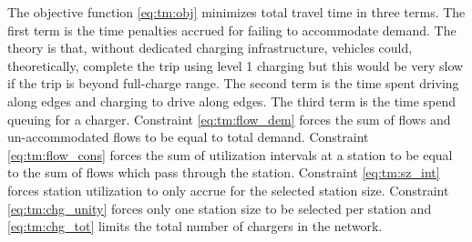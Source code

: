 \documentclass[12pt]{article}
\begin{document}
The objective function \eqref{eq:tm:obj} minimizes total travel time in three terms. The first term is the time penalties accrued for failing to accommodate demand. The theory is that, without dedicated charging infrastructure, vehicles could, theoretically, complete the trip using level 1 charging but this would be very slow if the trip is beyond full-charge range. The second term is the time spent driving along edges and charging to drive along edges. The third term is the time spend queuing for a charger. Constraint \eqref{eq:tm:flow_dem} forces the sum of flows and un-accommodated flows to be equal to total demand. Constraint \eqref{eq:tm:flow_cons} forces the sum of utilization intervals at a station to be equal to the sum of flows which pass through the station. Constraint \eqref{eq:tm:sz_int} forces station utilization to only accrue for the selected station size. Constraint \eqref{eq:tm:chg_unity} forces only one station size to be selected per station and \eqref{eq:tm:chg_tot} limits the total number of chargers in the network.
\end{document}
